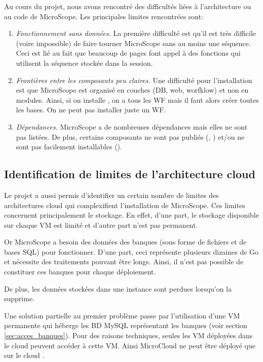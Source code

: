 Au cours du projet, nous avons rencontré des difficultés liées à l'architecture ou au code de MicroScope.
Les principales limites rencontrées sont:
\begin{enumerate}
    \item \emph{Fonctionnement sans données.} La première difficulté est qu'il est très difficile (voire impossible) de faire tourner MicroScope sans au moins une séquence.
          Ceci est lié au fait que beaucoup de pages font appel à des fonctions qui utilisent la séquence stockée dans la session.
    \item \emph{Frontières entre les composants peu claires.} Une difficulté pour l'installation est que MicroScope est organisé en couches (DB, web, worfklow) et non en modules.
          Ainsi, si on installe , on a tous les WF mais il faut alors créer toutes les bases.
          On ne peut pas installer juste un WF.
    \item \emph{Dépendances.} MicroScope a de nombreuses dépendances mais elles ne sont pas listées.
          De plus, certains composants ne sont pas publiés (, )
          et/ou ne sont pas facilement installables ().
\end{enumerate}

\subsection{Identification de limites de l'architecture cloud} \label{subsec:limites_coud}

Le projet a aussi permis d'identifier un certain nombre de limites des architectures cloud
qui complexifient l'installation de MicroScope.
Ces limites concernent principalement le stockage.
En effet, d'une part, le stockage disponible sur chaque VM est limité et
d'autre part n'est pas permanent.

Or MicroScope a besoin des données des banques (sous forme de fichiers et de bases SQL) pour fonctionner.
D'une part, ceci représente plusieurs dizaines de Go
et nécessite des traitements pouvant être longs.
Ainsi, il n'est pas possible de constituer ces banques pour chaque déploiement.

De plus, les données stockées dans une instance sont perdues lorsqu'on la supprime.

Une solution partielle au premier problème passe par l'utilisation d'une VM permanente
qui héberge les BD MySQL représentant les banques (voir section \ref{sec:acces_banques}).
Pour des raisons techniques, seules les VM déployées dans le cloud 
peuvent accéder à cette VM.
Ainsi MicroCloud ne peut être déployé que sur le cloud .


